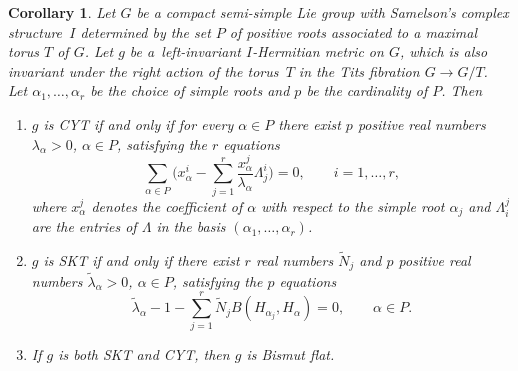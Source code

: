 \documentclass[10pt,a4paper]{amsart}
\numberwithin{equation}{section}
\newtheorem{Corollary}[Theorem]{Corollary}
\begin{document}
\begin{Corollary} \label{coroBismutflat}
Let $G$ be a compact semi-simple Lie group with Samelson's complex structure~$I$ determined by the set $P$ of positive roots associated to a maximal torus $T$ of $G$. Let $g$ be a~left-invariant $I$-Hermitian metric on $G$, which is also invariant under the right action of the torus~$T$ in the Tits fibration $G\rightarrow G/T$. Let $\alpha_1, \dots,\alpha_r$ be the choice of simple roots and $p$ be the cardinality of $P$.
Then
\begin{enumerate}
 \item[$(i)$] $g$ is CYT if and only if for every $\alpha \in P$ there exist $p$ positive real numbers $\lambda_{\alpha} > 0$, $\alpha \in P$, satisfying the $r$ equations
\begin{equation}\label{CYTsystem}
\sum_{\alpha \in P} \Bigg( x_\alpha^i - \sum_{j=1}^r \frac{x_\alpha^j}{\lambda_{\alpha}} \Lambda^i_j \Bigg) =0, \qquad i = 1, \dots, r,
\end{equation}
where $x_{\alpha}^j$ denotes the coefficient of $\alpha$ with respect to the simple root $\alpha_j$ and $\Lambda_i^j$ are the entries of $\Lambda$ in the basis $(\alpha_1, \dots,\alpha_r)$.
 \item[$(ii)$] $g$ is SKT if and only if there exist $r$ real numbers $ \tilde N_j$ and $p$ positive real numbers $ \tilde \lambda_{\alpha} >0$, $\alpha \in P$, satisfying the $p$ equations
\begin{equation}\label{SKTsystem}
\tilde \lambda_{\alpha} - 1 - \sum_{j = 1}^r \tilde N_j B(H_{\alpha_j}, H_{\alpha})=0, \qquad \alpha \in P.
\end{equation}
 \item[$(iii)$] If $g$ is both SKT and CYT, then $g$ is Bismut flat.
 \end{enumerate}
\end{Corollary}
\end{document}
